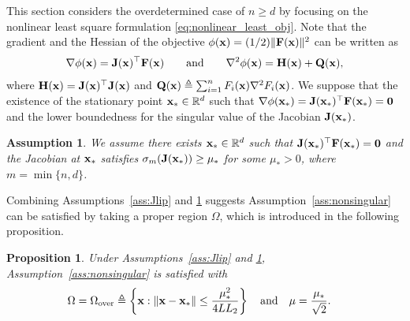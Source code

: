 \documentclass[11pt]{article}
\theoremstyle{plain}
\newtheorem{proposition}[theorem]{Proposition}
\newtheorem{assumption}[theorem]{Assumption}
\theoremstyle{definition}
\theoremstyle{remark}
\theoremstyle{plain}
\def\vx{{\bf{x}}}
\def\BR{{\mathbb{R}}}
\def\mF {{\bf F}}
\def\mH {{\bf H}}
\def\mJ {{\bf J}}
\def\vx {{{\bf x}}}
\def\BR{{\mathbb{R}}}
\def\F{{\bf F}}
\def\H{{\bf H}}
\def \J{{\bf J}}
\def\Q{{\bf Q}}
\def\x{{\bf x}}
\def\0{{\bf 0}}
\begin{document}
This section considers the overdetermined case of $n\geq d$ by focusing on the nonlinear least square formulation \eqref{eq:nonlinear_least_obj}. 
Note that the gradient and the Hessian of the objective
$\phi(\x)=(1/2)\|\F(\x)\|^2$ can be written as
\begin{align*}
\nabla \phi(\vx)=\mJ(\vx)^\top\mF(\vx)
\qquad\text{and}\qquad
\nabla^2\phi(\x) =\H(\x) + \Q(\x),
\end{align*}
where $\mH(\vx)=\mJ(\vx)^\top\mJ(\vx)$ and $\Q(\x)\triangleq \sum_{i=1}^n F_i(\x)\nabla^2 F_i(\x)$.
We suppose that the existence of the stationary point  $\x_*\in\BR^d$ such that 
$\nabla\phi(\vx_*)=\mJ(\x_*)^{\top}\F(\x_*)=\0$
and the lower boundedness for the singular value of the Jacobian $\J(\x_*)$.
\begin{assumption}
\label{ass:nonsingular_J^*}
We assume there exists $\x_*\in\BR^d$ such that $\J(\x_*)^{\top}\F(\x_*)=\0$ and the Jacobian at $\x_*$ satisfies $\sigma_m(\J(\x_*))\geq \mu_*$ for some $\mu_*>0$, where $m=\min\{n,d\}$.
\end{assumption}
Combining Assumptions~\ref{ass:Jlip} and \ref{ass:nonsingular_J^*} suggests  Assumption~\ref{ass:nonsingular} can be satisfied by taking a proper region $\Omega$, which is introduced in the following proposition. 
\begin{proposition}
\label{prop:local_nonsingularity}
    Under Assumptions~\ref{ass:Jlip} and \ref{ass:nonsingular_J^*}, Assumption~\ref{ass:nonsingular} is satisfied with
    \begin{align*}
    \Omega
    &=\Omega_{\mathrm{over}}
    \triangleq\left\{\x:\|\x-\x_*\|\leq \frac{\mu^2_*}{4LL_2}\right\}
    \quad\text{and}\quad
    \mu=\frac{\mu_*}{\sqrt{2}}.
    \end{align*}
\end{proposition}
\end{document}
